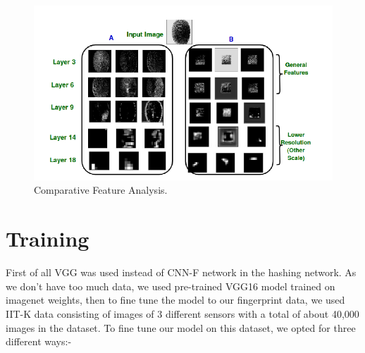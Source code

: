 \begin{figure}[htbp]
\centering
\includegraphics[scale=1]{./Chapter4/Figures/FeatureAnalysis}
\caption{Comparative Feature Analysis.}
\label{fig:figure4}
\end{figure}

\section{Training }
First of all VGG was used instead of CNN-F network in the hashing network. As we don't have too much data, we used pre-trained VGG16 model trained on imagenet weights, then to fine tune the model to our fingerprint data, we used IIT-K data consisting of images of 3 different sensors with a total of about 40,000 images in the dataset. To fine tune our model on this dataset, we opted for three different ways:-


